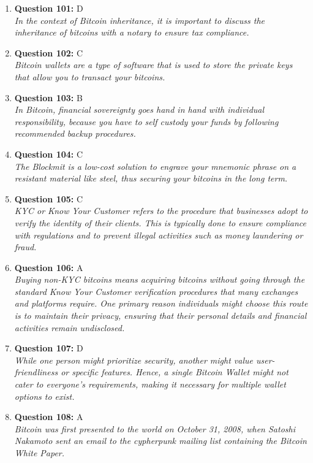\documentclass[12pt,a4paper]{article}
\begin{document}
\begin{enumerate}
\item \textbf{Question 101:} D
\\ \textit{In the context of Bitcoin inheritance, it is important to discuss the inheritance of bitcoins with a notary to ensure tax compliance.}

\item \textbf{Question 102:} C
\\ \textit{Bitcoin wallets are a type of software that is used to store the private keys that allow you to transact your bitcoins.}

\item \textbf{Question 103:} B
\\ \textit{In Bitcoin, financial sovereignty goes hand in hand with individual responsibility, because you have to self custody your funds by following recommended backup procedures.}

\item \textbf{Question 104:} C
\\ \textit{The Blockmit is a low-cost solution to engrave your mnemonic phrase on a resistant material like steel, thus securing your bitcoins in the long term.}

\item \textbf{Question 105:} C
\\ \textit{KYC or Know Your Customer refers to the procedure that businesses adopt to verify the identity of their clients. This is typically done to ensure compliance with regulations and to prevent illegal activities such as money laundering or fraud.}

\item \textbf{Question 106:} A
\\ \textit{Buying non-KYC bitcoins means acquiring bitcoins without going through the standard Know Your Customer verification procedures that many exchanges and platforms require. One primary reason individuals might choose this route is to maintain their privacy, ensuring that their personal details and financial activities remain undisclosed.}

\item \textbf{Question 107:} D
\\ \textit{While one person might prioritize security, another might value user-friendliness or specific features. Hence, a single Bitcoin Wallet might not cater to everyone's requirements, making it necessary for multiple wallet options to exist.}

\item \textbf{Question 108:} A
\\ \textit{Bitcoin was first presented to the world on October 31, 2008, when Satoshi Nakamoto sent an email to the cypherpunk mailing list containing the Bitcoin White Paper.}


\end{enumerate}
\end{document}
